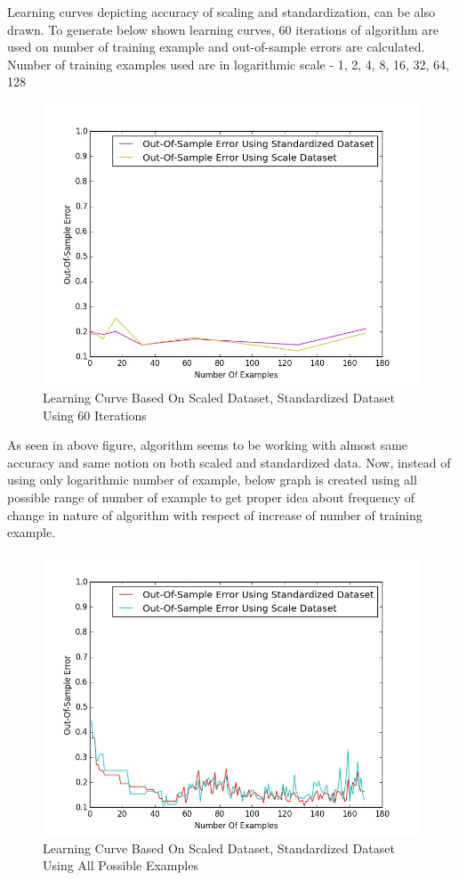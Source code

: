 \documentclass{article}
\begin{document}
\par Learning curves depicting accuracy of scaling and standardization, can be also drawn. To generate below shown learning curves, 60 iterations of algorithm are used on number of training example and out-of-sample errors are calculated. Number of training examples used are in logarithmic scale - 1, 2, 4, 8, 16, 32, 64, 128
\begin{figure}[H]
\centering
\includegraphics[width=5in]{images/60Iter_Standardized.jpeg}
\caption{Learning Curve Based On Scaled Dataset, Standardized Dataset Using 60 Iterations}
\label{4. Learning Curve}
  
\end{figure}
\par As seen in above figure, algorithm seems to be working with almost same accuracy and same notion on both scaled and standardized data. Now, instead of using only logarithmic number of example, below graph is created using all possible range of number of example to get proper idea about frequency of change in nature of algorithm with respect of increase of number of training example.
\begin{figure}[H]
\centering
\includegraphics[width=5in]{images/LearningCurveForStandardizedVSNormalization.jpeg}
\caption{Learning Curve Based On Scaled Dataset, Standardized Dataset Using All Possible Examples}
\label{5. Learning Curve}
  
\end{figure}
\end{document}
